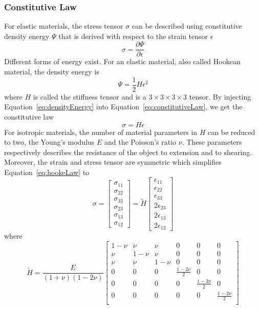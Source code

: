 \subsubsection{Constitutive Law}
For elastic materials, the stress tensor $\sigma$ can be described using constitutive density energy $\Psi$ that is derived with respect to the strain tensor $\epsilon$
\begin{equation}
\label{eq:constitutiveLaw}
\sigma = \frac{\partial \Psi}{\partial \epsilon}
\end{equation}
Different forms of energy exist. 
For an elastic material, also called Hookean material, the density energy is
\begin{equation}
\label{eq:densityEnergy}
\Psi = \frac{1}{2}H\epsilon^{2}
\end{equation}
where $H$ is called the stiffness tensor and is a $3\times3\times3\times3$ tensor. By injecting Equation~\eqref{eq:densityEnergy} into Equation~\eqref{eq:constitutiveLaw}, we get the constitutive law
\begin{equation}
\label{eq:hookeLaw}
\sigma = H\epsilon
\end{equation}
For isotropic materials, the number of material parameters in $H$ can be reduced to two, the Young's modulus $E$ and the Poisson's ratio $\nu$.
These parameters respectively describes the resistance of the object to extension and to shearing.
Moreover, the strain and stress tensor are symmetric which simplifies Equation~\eqref{eq:hookeLaw} to
\begin{equation}
\sigma = 
\begin{bmatrix}
\sigma_{11} \\
\sigma_{22} \\
\sigma_{33} \\
\sigma_{23} \\
\sigma_{13} \\
\sigma_{12}
\end{bmatrix}
=
\tilde{H}
\begin{bmatrix}
\epsilon_{11} \\
\epsilon_{22} \\
\epsilon_{33} \\
2\epsilon_{23} \\
2\epsilon_{13} \\
2\epsilon_{12}
\end{bmatrix}
\end{equation}
where
\begin{equation}
\tilde{H} =
\frac{E}{\left(1+\nu\right)\left(1-2\nu\right)}
\begin{bmatrix}
1-\nu & \nu & \nu & 0 & 0 & 0 \\ 
\nu & 1-\nu & \nu & 0 & 0 & 0 \\
\nu & \nu & 1-\nu & 0 & 0 & 0 \\
0 & 0 & 0 & \frac{1-2\nu}{2} & 0 & 0 \\
0 & 0 & 0 & 0 & \frac{1-2\nu}{2} & 0 \\
0 & 0 & 0 & 0 & 0 & \frac{1-2\nu}{2} \\
\end{bmatrix}
\end{equation}
